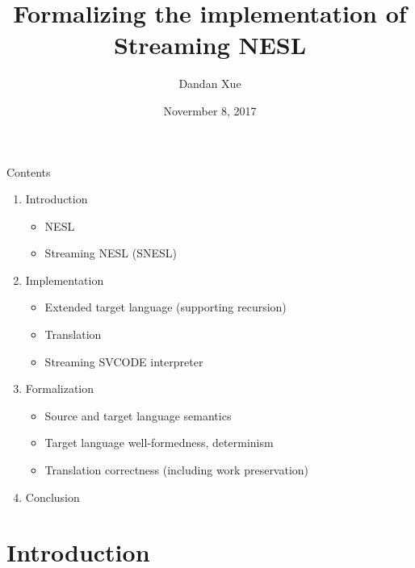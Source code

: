 \documentclass{beamer}
\title{Formalizing the implementation of \\ Streaming NESL}
\author{Dandan Xue}
\date{Novermber 8, 2017}
\institute{Department of Computer Science (DIKU) \\ University of Copenhagen}
\begin{document}
\maketitle


\begin{frame}{Contents}
	\begin{enumerate}
		\item Introduction
		\begin{itemize}
			\item NESL
			\item Streaming NESL (SNESL)
		\end{itemize}
		\item Implementation
		\begin{itemize}
			\item Extended target language (supporting recursion)
			\item Translation 
			\item Streaming SVCODE interpreter
		\end{itemize}
		
		\item Formalization
			\begin{itemize}
				\item Source and target language semantics
				\item Target language well-formedness, determinism 
				\item Translation correctness (including work preservation)
			\end{itemize}
		\item Conclusion
	\end{enumerate}
\end{frame}

\section{Introduction}
\end{document}

